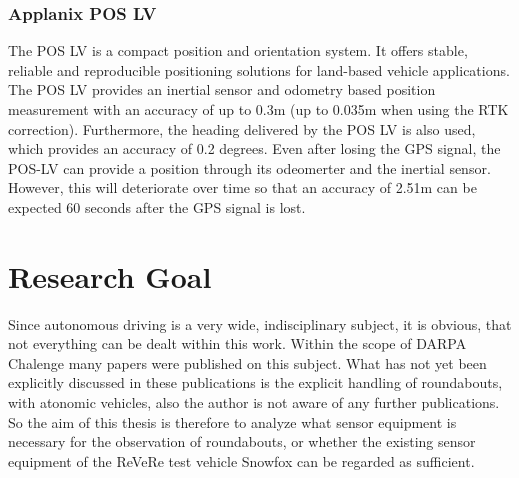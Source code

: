 \subsubsection{Applanix POS LV}
The POS LV is a compact position and orientation system. It offers stable, reliable and reproducible positioning solutions for land-based vehicle applications. The POS LV provides an 
inertial sensor and odometry based position measurement with an accuracy of up to 0.3m (up to 0.035m when using the RTK correction).
Furthermore, the heading delivered by the POS LV is also used, which provides an accuracy of 0.2 degrees. Even after losing the GPS signal,
the POS-LV can provide a position through its odeomerter and the inertial sensor. However, this will deteriorate over time so that an accuracy of 2.51m
can be expected 60 seconds after the GPS signal is lost. \cite{manAP}


\section{Research Goal}
Since autonomous driving is a very wide, indisciplinary subject, it is obvious, that not everything can be dealt within this work.
Within the scope of \acs{DARPA} Chalenge many papers were published on this subject. What has not yet been explicitly discussed in these publications
is the explicit handling of roundabouts, with atonomic vehicles, also the author is not aware of any further publications. 
So the aim of this thesis is therefore to analyze what sensor equipment is necessary for the observation of roundabouts,
or whether the existing sensor equipment of the ReVeRe test vehicle Snowfox can be regarded as sufficient.

